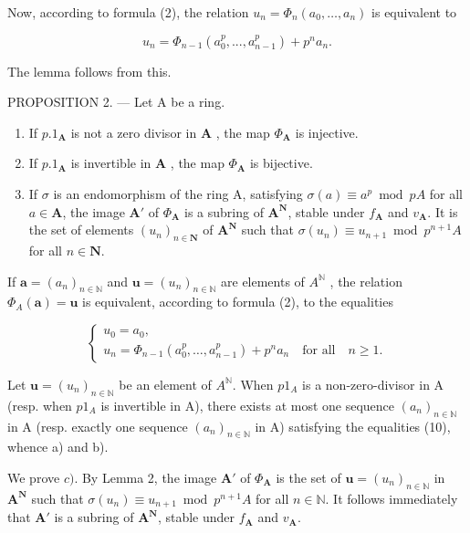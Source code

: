 Now, according to formula (2), the relation \(u_n = \Phi_n(a_0, \ldots, a_n)\) is equivalent to

\[
u _ {n} = \Phi_ {n - 1} (a _ {0} ^ {p},..., a _ {n - 1} ^ {p}) + p ^ {n} a _ {n}.\tag{9}
\]

The lemma follows from this.

PROPOSITION 2. --- Let A be a ring.

\begin{enumerate}
\def\labelenumi{\alph{enumi})}
\item
  If \(p.1_{\mathbf{A}}\) is not a zero divisor in \(\mathbf{A}\) , the map \(\Phi_{\mathbf{A}}\) is injective.
\item
  If \(p.1_{\mathbf{A}}\) is invertible in \(\mathbf{A}\) , the map \(\Phi_{\mathbf{A}}\) is bijective.
\item
  If \(\sigma\) is an endomorphism of the ring A, satisfying \(\sigma(a) \equiv a^p \bmod pA\) for all \(a \in \mathbf{A}\), the image \(\mathbf{A}'\) of \(\Phi_{\mathbf{A}}\) is a subring of \(\mathbf{A}^{\mathbf{N}}\), stable under \(f_{\mathbf{A}}\) and \(v_{\mathbf{A}}\). It is the set of elements \((u_n)_{n \in \mathbf{N}}\) of \(\mathbf{A}^{\mathbf{N}}\) such that \(\sigma(u_n) \equiv u_{n+1} \bmod p^{n+1}A\) for all \(n \in \mathbf{N}\).
\end{enumerate}

If \(\boldsymbol{a} = (a_n)_{n \in \mathbb{N}}\) and \(\boldsymbol{u} = (u_n)_{n \in \mathbb{N}}\) are elements of \(A^{\mathbb{N}}\) , the relation \(\Phi_A(\boldsymbol{a}) = \boldsymbol{u}\) is equivalent, according to formula (2), to the equalities

\[
\left\{ \begin{array}{l} u _ {0} = a _ {0}, \\ u _ {n} = \Phi_ {n - 1} \left(a _ {0} ^ {p}, \dots , a _ {n - 1} ^ {p}\right) + p ^ {n} a _ {n} \quad \text {for all} \quad n \geqslant 1. \end{array} \right.\tag{10}
\]

Let \(\boldsymbol{u} = (u_{n})_{n \in \mathbb{N}}\) be an element of \(A^{\mathbb{N}}\). When \(p1_{A}\) is a non-zero-divisor in A (resp. when \(p1_{A}\) is invertible in A), there exists at most one sequence \((a_{n})_{n \in \mathbb{N}}\) in A (resp. exactly one sequence \((a_{n})_{n \in \mathbb{N}}\) in A) satisfying the equalities (10), whence a) and b).

We prove \(c)\). By Lemma 2, the image \(\mathbf{A}'\) of \(\Phi_{\mathbf{A}}\) is the set of \(\boldsymbol{u} = (u_n)_{n \in \mathbb{N}}\) in \(\mathbf{A}^{\mathbf{N}}\) such that \(\sigma(u_n) \equiv u_{n+1} \bmod p^{n+1}A\) for all \(n \in \mathbb{N}\). It follows immediately that \(\mathbf{A}'\) is a subring of \(\mathbf{A}^{\mathbf{N}}\), stable under \(f_{\mathbf{A}}\) and \(v_{\mathbf{A}}\).

